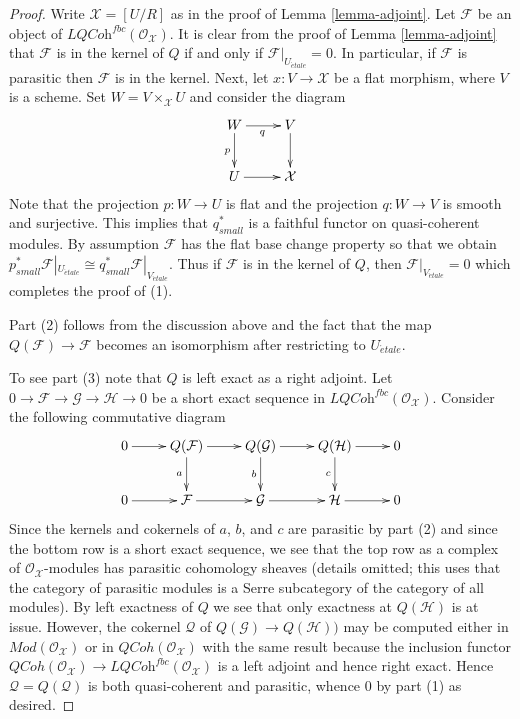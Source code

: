 \documentclass[10pt,a4paper]{amsart}
\theoremstyle{plain}
\theoremstyle{definition}
\theoremstyle{remark}
\numberwithin{equation}{subsection}
\def\etale{{\acute{e}tale}}
\def\QCoh{\mathit{QCoh}}
\begin{document}
\begin{proof}
Write $\mathcal{X} = [U/R]$ as in the proof of Lemma \ref{lemma-adjoint}.
Let $\mathcal{F}$ be an object of
$\textit{LQCoh}^{fbc}(\mathcal{O}_\mathcal{X})$.
It is clear from the proof of Lemma \ref{lemma-adjoint}
that $\mathcal{F}$ is in the kernel of $Q$ if and only if
$\mathcal{F}|_{U_\etale} = 0$.
In particular, if $\mathcal{F}$ is parasitic then $\mathcal{F}$ is in
the kernel. Next, let $x : V \to \mathcal{X}$ be a flat morphism, where
$V$ is a scheme. Set $W = V \times_\mathcal{X} U$ and consider the diagram
$$
\xymatrix{
W \ar[d]_p \ar[r]_q & V \ar[d] \\
U \ar[r] & \mathcal{X}
}
$$
Note that the projection $p : W \to U$ is flat and the projection
$q : W \to V$ is smooth and surjective. This implies that $q_{small}^*$
is a faithful functor on quasi-coherent modules. By assumption $\mathcal{F}$
has the flat base change property so that we obtain
$p_{small}^*\mathcal{F}|_{U_\etale} \cong
q_{small}^*\mathcal{F}|_{V_\etale}$. Thus if $\mathcal{F}$
is in the kernel of $Q$, then $\mathcal{F}|_{V_\etale} = 0$
which completes the proof of (1).

\medskip\noindent
Part (2) follows from the discussion above and the fact
that the map $Q(\mathcal{F}) \to \mathcal{F}$ becomes an isomorphism after
restricting to $U_\etale$.

\medskip\noindent
To see part (3) note that $Q$ is left exact as a right adjoint.
Let $0 \to \mathcal{F} \to \mathcal{G} \to \mathcal{H} \to 0$
be a short exact sequence in $\textit{LQCoh}^{fbc}(\mathcal{O}_\mathcal{X})$.
Consider the following commutative diagram
$$
\xymatrix{
0 \ar[r] &
Q(\mathcal{F}) \ar[r] \ar[d]_a &
Q(\mathcal{G}) \ar[r] \ar[d]_b &
Q(\mathcal{H}) \ar[r] \ar[d]_c & 0 \\
0 \ar[r] &
\mathcal{F} \ar[r] &
\mathcal{G} \ar[r] &
\mathcal{H} \ar[r] & 0
}
$$
Since the kernels and cokernels of $a$, $b$, and $c$ are parasitic by
part (2) and since the bottom row is a short exact sequence, we see that
the top row as a complex of $\mathcal{O}_\mathcal{X}$-modules has parasitic
cohomology sheaves (details omitted; this uses that the category of
parasitic modules is a Serre subcategory of the category of all modules).
By left exactness of $Q$ we see that only exactness at $Q(\mathcal{H})$
is at issue. However, the cokernel $\mathcal{Q}$ of
$Q(\mathcal{G}) \to Q(\mathcal{H}))$
may be computed either in $\textit{Mod}(\mathcal{O}_\mathcal{X})$
or in $\QCoh(\mathcal{O}_\mathcal{X})$ with the same result because
the inclusion functor $\QCoh(\mathcal{O}_\mathcal{X}) \to
\textit{LQCoh}^{fbc}(\mathcal{O}_\mathcal{X})$
is a left adjoint and hence right exact. Hence $\mathcal{Q} = Q(\mathcal{Q})$
is both quasi-coherent and parasitic, whence $0$ by part (1) as desired.


\end{proof}
\end{document}
